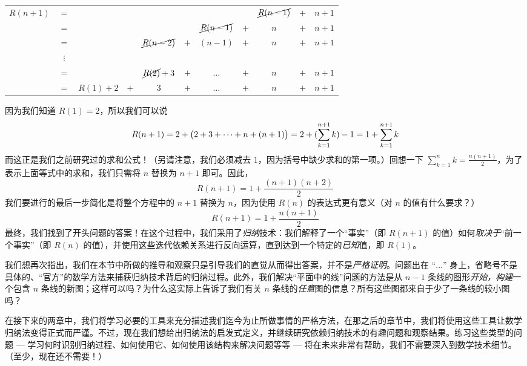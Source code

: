 \begin{center}
    \begin{tabular}{rcccccccccc}
        $R(n+1)$ & $=$ &          & &            &     &            &     & $\cancel{R(n-1)}$ & $+$ & $n+1$\\
                 & $=$ &          & &                   &     & $\cancel{R(n-1)}$ & $+$ & $n$ & $+$ & $n+1$\\
                 & $=$ &          & & $\cancel{R(n-2)}$ & $+$ & $(n-1)$           & $+$ & $n$ & $+$ & $n+1$\\
                 & $\vdots$ &     & &  &  &  &  &  &  & \\
                 & $=$ &          & & $\cancel{R(2)}+3$ & $+$ & $\dots$ & $+$ & $n$ & $+$ & $n+1$ \\
                 & $=$ & $R(1)+2$ & $+$ & $3$               & $+$ & $\dots$ & $+$ & $n$ & $+$ & $n+1$ \\
    \end{tabular}
\end{center}

因为我们知道 $R(1) = 2$，所以我们可以说
\[R(n + 1) = 2 + \big(2 + 3 + \dots + n + (n + 1)\big) = 2 + \Large(\sum_{k=1}^{n+1}k\Large)-1 = 1+\sum_{k=1}^{n+1}k\]
而这正是我们之前研究过的求和公式！（另请注意，我们必须减去 $1$，因为括号中缺少求和的第一项。）回想一下 $\sum_{k=1}^{n} k = \frac{n(n+1)}{2}$，为了表示上面等式中的求和，我们只需将 $n$ 替换为 $n + 1$ 即可。因此，
\[R(n + 1) = 1+\frac{(n+1)(n+2)}{2}\]
我们要进行的最后一步简化是将整个方程中的 $n+1$ 替换为 $n$，因为使用 $R(n)$ 的表达式更有意义（对 $n$ 的值有什么要求？）
\[R(n + 1) = 1+\frac{n(n+1)}{2}\]
最终，我们找到了开头问题的答案！在这个过程中，我们采用了\textit{归纳}技术：我们解释了一个“事实”（即 $R(n + 1)$ 的值）如何\textit{取决于}“前一个事实”（即 $R(n)$ 的值），并使用这些迭代依赖关系进行反向运算，直到达到一个特定的\textit{已知}值，即 $R(1)$。

我们想再次指出，我们在本节中所做的推导和观察只是引导我们的直觉从而得出答案，并不是\textit{严格证明}。问题出在 “$\dots$” 身上，省略号不是具体的、“官方”的数学方法来捕获归纳技术背后的归纳过程。此外，我们解决“平面中的线”问题的方法是从 $n - 1$ 条线的图形\textit{开始，构建}一个包含 $n$ 条线的新图；这样可以吗？为什么这实际上告诉了我们有关 $n$ 条线的\textit{任意}图的信息？所有这些图都来自于少了一条线的较小图吗？

在接下来的两章中，我们将学习必要的工具来充分描述我们迄今为止所做事情的严格方法，在那之后的章节中，我们将使用这些工具让数学归纳法变得正式而严谨。不过，现在我们想给出归纳法的启发式定义，并继续研究依赖归纳技术的有趣问题和观察结果。练习这些类型的问题 --- 学习何时识别归纳过程、如何使用它、如何使用该结构来解决问题等等 --- 将在未来非常有帮助，我们不需要深入到数学技术细节。（至少，现在还不需要！）


